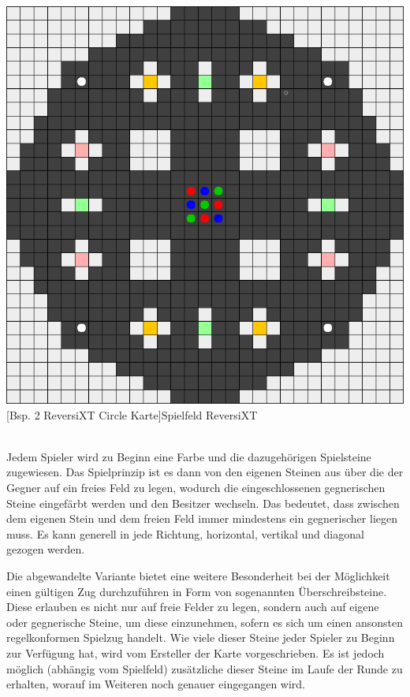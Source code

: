 \documentclass[12pt,a4paper,bibliography=totocnumbered,listof=totocnumbered]{article}
\begin{document}
\vspace{1em}
\begin{minipage}{\linewidth}
	\centering
	\includegraphics[width=0.7\linewidth]{pics/reversixt_circle_map.png}
	[Bsp. 2 ReversiXT Circle Karte]{Spielfeld ReversiXT}
	\label{fig:reversixt_circle_map}
\end{minipage}
\\

Jedem Spieler wird zu Beginn eine Farbe und die dazugehörigen Spielsteine zugewiesen. Das Spielprinzip ist es dann von den eigenen Steinen aus über die der Gegner auf ein freies Feld zu legen, wodurch die eingeschlossenen gegnerischen Steine eingefärbt werden und den Besitzer wechseln. Das bedeutet, dass zwischen dem eigenen Stein und dem freien Feld immer mindestens ein gegnerischer liegen muss. Es kann generell in jede Richtung, horizontal, vertikal und diagonal gezogen werden.

Die abgewandelte Variante bietet eine weitere Besonderheit bei der Möglichkeit einen gültigen Zug durchzuführen in Form von sogenannten Überschreibsteine. Diese erlauben es nicht nur auf freie Felder zu legen, sondern auch auf eigene oder gegnerische Steine, um diese einzunehmen, sofern es sich um einen ansonsten regelkonformen Spielzug handelt. Wie viele dieser Steine jeder Spieler zu Beginn zur Verfügung hat, wird vom Ersteller der Karte vorgeschrieben. Es ist jedoch möglich (abhängig vom Spielfeld) zusätzliche dieser Steine im Laufe der Runde zu erhalten, worauf im Weiteren noch genauer eingegangen wird. 
\end{document}
